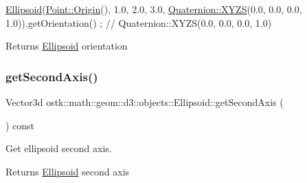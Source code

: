 \begin{DoxyCode}
\hyperlink{classostk_1_1math_1_1geom_1_1d3_1_1objects_1_1_ellipsoid_a106c71abf9503f3d06b2613c1c7e9d65}{Ellipsoid}(\hyperlink{classostk_1_1math_1_1geom_1_1d3_1_1objects_1_1_point_a079c199f08b015d456d02728a71b534c}{Point::Origin}(), 1.0, 2.0, 3.0, \hyperlink{classostk_1_1math_1_1geom_1_1d3_1_1trf_1_1rot_1_1_quaternion_ac57ea57a4033622ed1389101b2e58c76}{Quaternion::XYZS}(0.0, 0.0, 
      0.0, 1.0)).getOrientation() ; \textcolor{comment}{// Quaternion::XYZS(0.0, 0.0, 0.0, 1.0)}
\end{DoxyCode}


\begin{DoxyReturn}{Returns}
\hyperlink{classostk_1_1math_1_1geom_1_1d3_1_1objects_1_1_ellipsoid}{Ellipsoid} orientation 
\end{DoxyReturn}
\mbox{\label{classostk_1_1math_1_1geom_1_1d3_1_1objects_1_1_ellipsoid_a9a694ec8f31e617d4101bd31fa1519a0}} 
\subsubsection{\texorpdfstring{get\+Second\+Axis()}{getSecondAxis()}}
{\footnotesize\ttfamily Vector3d ostk\+::math\+::geom\+::d3\+::objects\+::\+Ellipsoid\+::get\+Second\+Axis (\begin{DoxyParamCaption}{ }\end{DoxyParamCaption}) const}



Get ellipsoid second axis. 

\begin{DoxyReturn}{Returns}
\hyperlink{classostk_1_1math_1_1geom_1_1d3_1_1objects_1_1_ellipsoid}{Ellipsoid} second axis 
\end{DoxyReturn}
\mbox{\label{classostk_1_1math_1_1geom_1_1d3_1_1objects_1_1_ellipsoid_a628df5e41c5b24722c74b54f604788da}} 

